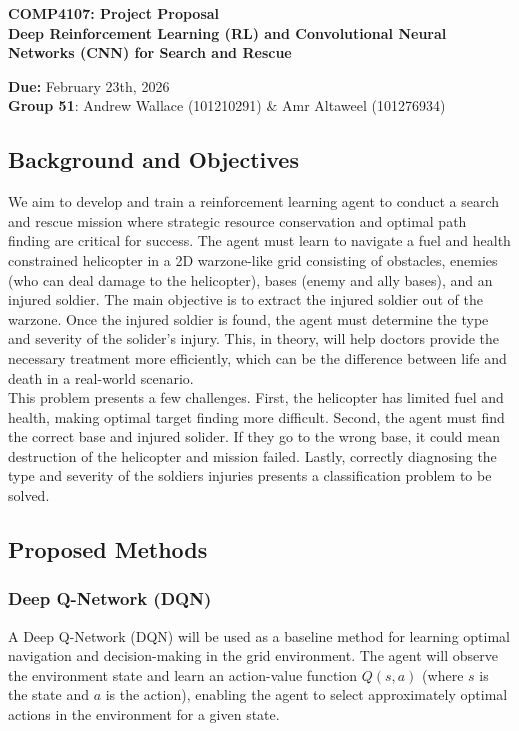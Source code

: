 \documentclass[12pt]{article}
\begin{document}
 

\begin{center} \bf
COMP4107: Project Proposal\\
\Large Deep Reinforcement Learning (RL) and Convolutional Neural Networks (CNN) for Search and Rescue
\end{center} 

\begin{center}
{\bf Due:} February 23th, 2026 \\
{\bf Group 51}: Andrew Wallace (101210291) \& Amr Altaweel (101276934)
\end{center}

\subsection*{Background and Objectives}
We aim to develop and train a reinforcement learning agent to conduct a search and rescue mission where strategic resource conservation and optimal path finding are critical for success. The agent must learn to navigate a fuel and health constrained helicopter in a 2D warzone-like grid consisting of obstacles, enemies (who can deal damage to the helicopter), bases (enemy and ally bases), and an injured soldier. The main objective is to extract the injured soldier out of the warzone. Once the injured soldier is found, the agent must determine the type and severity of the solider's injury. This, in theory, will help doctors provide the necessary treatment more efficiently, which can be the difference between life and death in a real-world scenario. \\[1em]
This problem presents a few challenges. First, the helicopter has limited fuel and health, making optimal target finding more difficult. Second, the agent must find the correct base and injured solider. If they go to the wrong base, it could mean destruction of the helicopter and mission failed. Lastly, correctly diagnosing the type and severity of the soldiers injuries presents a classification problem to be solved.

\subsection*{Proposed Methods}

\subsubsection*{Deep Q-Network (DQN)}
A Deep Q-Network (DQN) will be used as a baseline method for learning optimal navigation and decision-making in the grid environment. The agent will observe the environment state and learn an action-value function $Q(s, a)$ (where $s$ is the state and $a$ is the action), enabling the agent to select approximately optimal actions in the environment for a given state.
\end{document}

